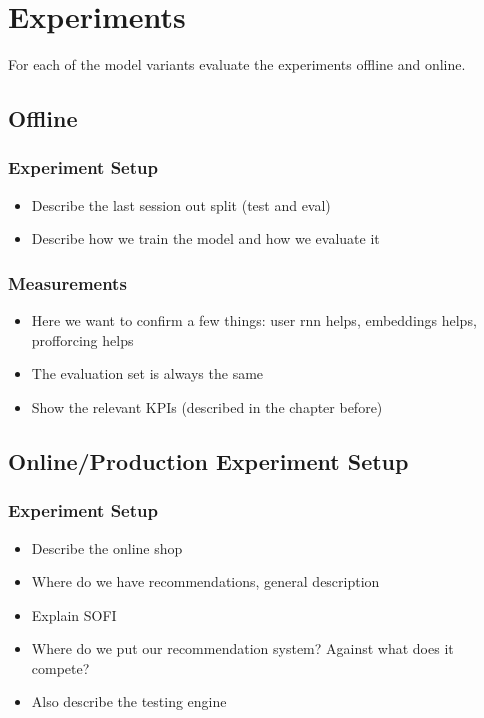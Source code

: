 \chapter{Experiments}
For each of the model variants evaluate the experiments offline and online.
\section{Offline}
\subsection{Experiment Setup}\label{sec:exp_setup}
\begin{itemize}
    \item Describe the last session out split (test and eval)
    \item Describe how we train the model and how we evaluate it
\end{itemize}
\subsection{Measurements}
\begin{itemize}
    \item Here we want to confirm a few things: user rnn helps, embeddings helps, profforcing helps
    \item The evaluation set is always the same
    \item Show the relevant KPIs (described in the chapter before)
\end{itemize}

\section{Online/Production Experiment Setup}
\subsection{Experiment Setup}
\begin{itemize}
    \item Describe the online shop
    \item Where do we have recommendations, general description
    \item Explain SOFI
    \item Where do we put our recommendation system? Against what does it compete?
    \item Also describe the testing engine
\end{itemize}
